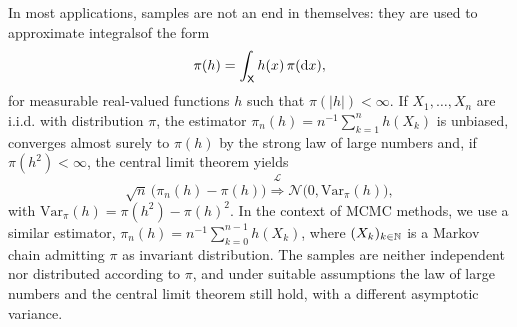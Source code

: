 \documentclass[english,graybox,envcountchap,envcountsame,sectrefs,shortlabels]{svmono}
\theoremstyle{style}
\newcommand{\dlim}[1]{\stackrel{\mathcal{L}_{#1}}{\Rightarrow}}
\newcommand{\gauss}{\mathcal{N}}
\newcommand{\eqsp}{}
\newcommand{\Xset}{\mathsf{X}}
\begin{document}
In most applications, samples are not an end in themselves: they are used to approximate integralsof the form
$$
\pi(h) = \int_\Xset h(x)\,\pi(\rmd x)\eqsp,
$$
for measurable  real-valued functions $h$ such that $\pi(|h|)<\infty$. If $X_1,\ldots,X_n$ are i.i.d. with distribution $\pi$, the estimator $\pi_n(h) = n^{-1}\sum_{k=1}^n h(X_k)$ is unbiased, converges almost surely to $\pi(h)$ by the strong law of large numbers and, if $\pi(h^2)<\infty$, the central limit theorem yields
$$
\sqrt{n}\,\big(\pi_n(h)-\pi(h)\big) \dlim{} \gauss\big(0,\mathrm{Var}_\pi(h)\big)\eqsp,
$$
with  $\mathrm{Var}_\pi(h) = \pi(h^2)-\pi(h)^2$. In the context of MCMC methods, we use a similar estimator, $\pi_n(h)=n^{-1}\sum_{k=0}^{n-1}h(X_k)$, where $(X_k)_{k\in\mathbb{N}}$ is a Markov chain admitting $\pi$ as invariant distribution. The samples are neither independent nor distributed according to $\pi$, and under suitable assumptions the law of large numbers and the central limit theorem still hold, with a different asymptotic variance.
\end{document}
